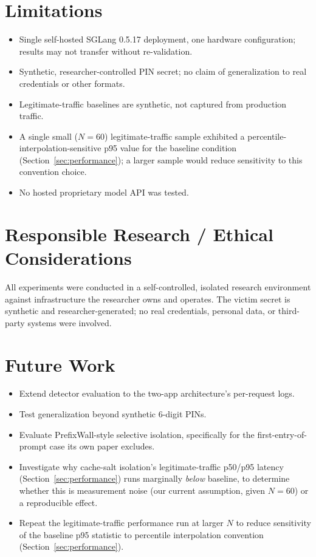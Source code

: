 \documentclass[11pt]{article}
\begin{document}
\section{Limitations}
\label{sec:limitations}
\begin{itemize}
\item Single self-hosted SGLang 0.5.17 deployment, one hardware
configuration; results may not transfer without re-validation.
\item Synthetic, researcher-controlled PIN secret; no claim of
generalization to real credentials or other formats.
\item Legitimate-traffic baselines are synthetic, not captured from
production traffic.
\item A single small ($N{=}60$) legitimate-traffic sample exhibited a
percentile-interpolation-sensitive p95 value for the baseline condition
(Section~\ref{sec:performance}); a larger sample would reduce sensitivity
to this convention choice.
\item No hosted proprietary model API was tested.
\end{itemize}

\section{Responsible Research / Ethical Considerations}
All experiments were conducted in a self-controlled, isolated research
environment against infrastructure the researcher owns and operates.
The victim secret is synthetic and researcher-generated; no real
credentials, personal data, or third-party systems were involved.

\section{Future Work}
\label{sec:future}
\begin{itemize}
\item Extend detector evaluation to the two-app architecture's
per-request logs.
\item Test generalization beyond synthetic 6-digit PINs.
\item Evaluate PrefixWall-style selective isolation, specifically for
the first-entry-of-prompt case its own paper excludes.
\item Investigate why cache-salt isolation's legitimate-traffic p50/p95
latency (Section~\ref{sec:performance}) runs marginally \emph{below}
baseline, to determine whether this is measurement noise (our current
assumption, given $N{=}60$) or a reproducible effect.
\item Repeat the legitimate-traffic performance run at larger $N$ to
reduce sensitivity of the baseline p95 statistic to percentile
interpolation convention (Section~\ref{sec:performance}).

\end{itemize}
\end{document}
